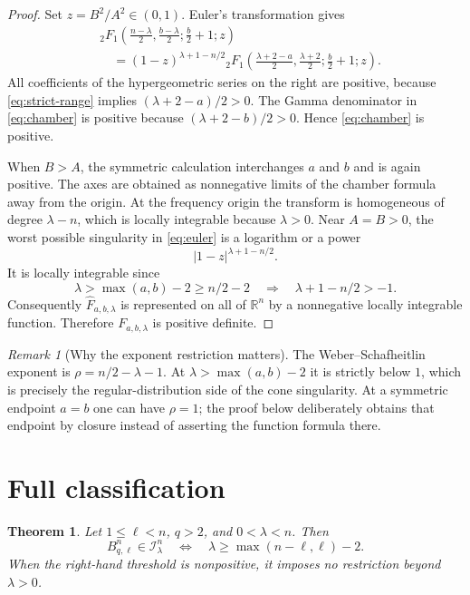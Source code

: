 \documentclass[11pt]{article}
\newtheorem{theorem}{Theorem}
\theoremstyle{remark}
\newtheorem{remark}{Remark}
\newcommand{\R}{\mathbb R}
\newcommand{\Iclass}{\mathcal I}
\begin{document}
\begin{proof}
Set $z=B^2/A^2\in(0,1)$.  Euler's transformation gives
\begin{align}
&{}_2F_1\left(\frac{n-\lambda}{2},\frac{b-\lambda}{2};
\frac b2+1;z\right) \label{eq:euler}\\
&\quad=(1-z)^{\lambda+1-n/2}
{}_2F_1\left(\frac{\lambda+2-a}{2},\frac{\lambda+2}{2};
\frac b2+1;z\right).\nonumber
\end{align}
All coefficients of the hypergeometric series on the right are positive,
because \eqref{eq:strict-range} implies
$(\lambda+2-a)/2>0$.  The Gamma denominator in
\eqref{eq:chamber} is positive because
$(\lambda+2-b)/2>0$.  Hence \eqref{eq:chamber} is positive.

When $B>A$, the symmetric calculation interchanges $a$ and $b$ and is again
positive.  The axes are obtained as nonnegative limits of the chamber
formula away from the origin.  At the frequency origin the transform is
homogeneous of degree $\lambda-n$, which is locally integrable because
$\lambda>0$.  Near $A=B>0$, the worst possible singularity in
\eqref{eq:euler} is a logarithm or a power
\[
|1-z|^{\lambda+1-n/2}.
\]
It is locally integrable since
\[
\lambda>\max(a,b)-2\geq n/2-2
\quad\Longrightarrow\quad
\lambda+1-n/2>-1.
\]
Consequently $\widehat F_{a,b,\lambda}$ is represented on all of
$\R^n$ by a nonnegative locally integrable function.  Therefore
$F_{a,b,\lambda}$ is positive definite.
\end{proof}

\begin{remark}[Why the exponent restriction matters]
The Weber--Schafheitlin exponent is $\rho=n/2-\lambda-1$.  At
$\lambda>\max(a,b)-2$ it is strictly below $1$, which is precisely the
regular-distribution side of the cone singularity.  At a symmetric endpoint
$a=b$ one can have $\rho=1$; the proof below deliberately obtains that
endpoint by closure instead of asserting the function formula there.
\end{remark}

\section{Full classification}

\begin{theorem}\label{thm:classification}
Let $1\leq\ell<n$, $q>2$, and $0<\lambda<n$.  Then
\begin{equation}\label{eq:classification}
B^n_{q,\ell}\in\Iclass^n_\lambda
\quad\Longleftrightarrow\quad
\lambda\geq\max(n-\ell,\ell)-2.
\end{equation}
When the right-hand threshold is nonpositive, it imposes no restriction
beyond $\lambda>0$.
\end{theorem}
\end{document}
